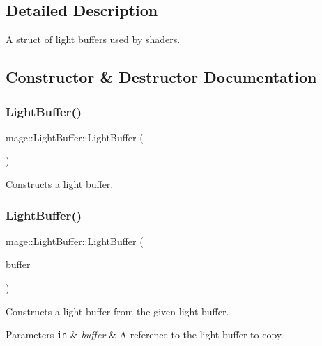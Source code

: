 \subsection{Detailed Description}
A struct of light buffers used by shaders. 

\subsection{Constructor \& Destructor Documentation}
\hypertarget{structmage_1_1_light_buffer_a5ebb95f741d86b719ad25d56fac3ff66}{}\label{structmage_1_1_light_buffer_a5ebb95f741d86b719ad25d56fac3ff66} 
\subsubsection{\texorpdfstring{Light\+Buffer()}{LightBuffer()}\hspace{0.1cm}{\footnotesize\ttfamily [1/3]}}
{\footnotesize\ttfamily mage\+::\+Light\+Buffer\+::\+Light\+Buffer (\begin{DoxyParamCaption}{ }\end{DoxyParamCaption})}

Constructs a light buffer. \hypertarget{structmage_1_1_light_buffer_a94aed51e6bdaf47c5f818f84b3e4edf4}{}\label{structmage_1_1_light_buffer_a94aed51e6bdaf47c5f818f84b3e4edf4} 
\subsubsection{\texorpdfstring{Light\+Buffer()}{LightBuffer()}\hspace{0.1cm}{\footnotesize\ttfamily [2/3]}}
{\footnotesize\ttfamily mage\+::\+Light\+Buffer\+::\+Light\+Buffer (\begin{DoxyParamCaption}\item[{const \hyperlink{structmage_1_1_light_buffer}{Light\+Buffer} \&}]{buffer }\end{DoxyParamCaption})\hspace{0.3cm}{\ttfamily [default]}}

Constructs a light buffer from the given light buffer.


\begin{DoxyParams}[1]{Parameters}
\mbox{\tt in}  & {\em buffer} & A reference to the light buffer to copy. \\
\hline
\end{DoxyParams}
\hypertarget{structmage_1_1_light_buffer_af0bb4f34aebc13b8cbd81e26fb8f6ecf}{}\label{structmage_1_1_light_buffer_af0bb4f34aebc13b8cbd81e26fb8f6ecf} 
